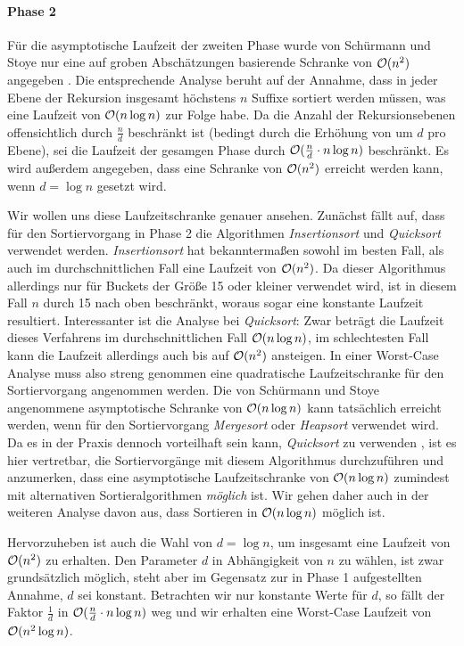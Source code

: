 \paragraph*{Phase 2}
Für die asymptotische Laufzeit der zweiten Phase wurde von Schürmann und Stoye nur eine auf groben Abschätzungen basierende Schranke von \(\mathcal{O}(n^2)\) angegeben \cite[Kapitel~3.2]{saca:2}. Die entsprechende Analyse beruht auf der Annahme, dass in jeder Ebene der Rekursion insgesamt höchstens \(n\) Suffixe sortiert werden müssen, was eine Laufzeit von \(\mathcal{O}(n \log n)\) zur Folge habe. Da die Anzahl der Rekursionsebenen offensichtlich durch \(\frac n d\) beschränkt ist (bedingt durch die Erhöhung von \offset um \(d\) pro Ebene), sei die Laufzeit der gesamgen Phase durch \(\mathcal{O}(\frac n d \cdot n \log n)\) beschränkt. Es wird außerdem angegeben, dass eine Schranke von \(\mathcal{O}(n^2)\) erreicht werden kann, wenn \(d = \log n\) gesetzt wird.\par\smallskip
Wir wollen uns diese Laufzeitschranke genauer ansehen. Zunächst fällt auf, dass für den Sortiervorgang in Phase 2 die Algorithmen \emph{Insertionsort} und \emph{Quicksort} verwendet werden. \emph{Insertionsort} hat bekanntermaßen sowohl im besten Fall, als auch im durchschnittlichen Fall eine Laufzeit von \(\mathcal{O}(n^2)\). Da dieser Algorithmus allerdings nur für Buckets der Größe 15 oder kleiner verwendet wird, ist in diesem Fall \(n\) durch 15 nach oben beschränkt, woraus sogar eine konstante Laufzeit resultiert. Interessanter ist die Analyse bei \emph{Quicksort}: Zwar beträgt die Laufzeit dieses Verfahrens im durchschnittlichen Fall \(\mathcal{O}(n \log n)\), im schlechtesten Fall kann die Laufzeit allerdings auch bis auf \(\mathcal{O}(n^2)\) ansteigen. In einer Worst-Case Analyse muss also streng genommen eine quadratische Laufzeitschranke für den Sortiervorgang angenommen werden. Die von Schürmann und Stoye angenommene asymptotische Schranke von \(\mathcal{O}(n \log n)\) kann tatsächlich erreicht werden, wenn für den Sortiervorgang \emph{Mergesort} oder \emph{Heapsort} verwendet wird. Da es in der Praxis dennoch vorteilhaft sein kann, \emph{Quicksort} zu verwenden \cite[Tabelle~1]{quicksort}, ist es hier vertretbar, die Sortiervorgänge mit diesem Algorithmus durchzuführen und anzumerken, dass eine asymptotische Laufzeitschranke von \(\mathcal{O}(n \log n)\) zumindest mit alternativen Sortieralgorithmen \emph{möglich} ist. Wir gehen daher auch in der weiteren Analyse davon aus, dass Sortieren in \(\mathcal{O}(n \log n)\) möglich ist.\par
Hervorzuheben ist auch die Wahl von \(d = \log n\), um insgesamt eine Laufzeit von \(\mathcal{O}(n^2)\) zu erhalten. Den Parameter \(d\) in Abhängigkeit von \(n\) zu wählen, ist zwar grundsätzlich möglich, steht aber im Gegensatz zur in Phase 1 aufgestellten Annahme, \(d\) sei konstant. Betrachten wir nur konstante Werte für \(d\), so fällt der Faktor \(\frac 1 d\) in \(\mathcal{O}(\frac n d \cdot n \log n)\) weg und wir erhalten eine Worst-Case Laufzeit von \(\mathcal{O}(n^2\log n)\).\par\smallskip
